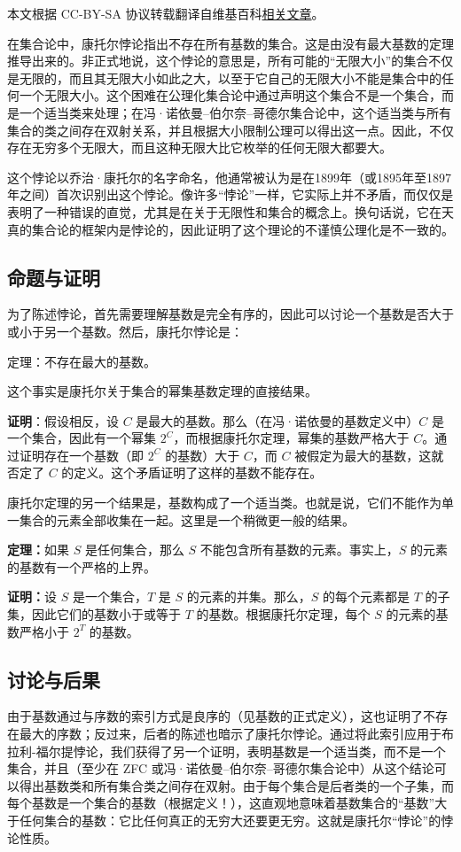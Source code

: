 
本文根据 CC-BY-SA 协议转载翻译自维基百科\href{https://en.wikipedia.org/wiki/Cantor\%27s_paradox}{相关文章}。

在集合论中，康托尔悖论指出不存在所有基数的集合。这是由没有最大基数的定理推导出来的。非正式地说，这个悖论的意思是，所有可能的“无限大小”的集合不仅是无限的，而且其无限大小如此之大，以至于它自己的无限大小不能是集合中的任何一个无限大小。这个困难在公理化集合论中通过声明这个集合不是一个集合，而是一个适当类来处理；在冯·诺依曼–伯尔奈–哥德尔集合论中，这个适当类与所有集合的类之间存在双射关系，并且根据大小限制公理可以得出这一点。因此，不仅存在无穷多个无限大，而且这种无限大比它枚举的任何无限大都要大。

这个悖论以乔治·康托尔的名字命名，他通常被认为是在1899年（或1895年至1897年之间）首次识别出这个悖论。像许多“悖论”一样，它实际上并不矛盾，而仅仅是表明了一种错误的直觉，尤其是在关于无限性和集合的概念上。换句话说，它在天真的集合论的框架内是悖论的，因此证明了这个理论的不谨慎公理化是不一致的。
\subsection{命题与证明}
为了陈述悖论，首先需要理解基数是完全有序的，因此可以讨论一个基数是否大于或小于另一个基数。然后，康托尔悖论是：

定理：不存在最大的基数。

这个事实是康托尔关于集合的幂集基数定理的直接结果。

\textbf{证明}：假设相反，设 $C$ 是最大的基数。那么（在冯·诺依曼的基数定义中）$C$ 是一个集合，因此有一个幂集 $2^C$，而根据康托尔定理，幂集的基数严格大于 $C$。通过证明存在一个基数（即 $2^C$ 的基数）大于 $C$，而 $C$ 被假定为最大的基数，这就否定了 $C$ 的定义。这个矛盾证明了这样的基数不能存在。

康托尔定理的另一个结果是，基数构成了一个适当类。也就是说，它们不能作为单一集合的元素全部收集在一起。这里是一个稍微更一般的结果。

\textbf{定理：}如果 $S$ 是任何集合，那么 $S$ 不能包含所有基数的元素。事实上，$S$ 的元素的基数有一个严格的上界。

\textbf{证明：}设 $S$ 是一个集合，$T$ 是 $S$ 的元素的并集。那么，$S$ 的每个元素都是 $T$ 的子集，因此它们的基数小于或等于 $T$ 的基数。根据康托尔定理，每个 $S$ 的元素的基数严格小于 $2^T$ 的基数。
\subsection{讨论与后果}
由于基数通过与序数的索引方式是良序的（见基数的正式定义），这也证明了不存在最大的序数；反过来，后者的陈述也暗示了康托尔悖论。通过将此索引应用于布拉利-福尔提悖论，我们获得了另一个证明，表明基数是一个适当类，而不是一个集合，并且（至少在 ZFC 或冯·诺依曼–伯尔奈–哥德尔集合论中）从这个结论可以得出基数类和所有集合类之间存在双射。由于每个集合是后者类的一个子集，而每个基数是一个集合的基数（根据定义！），这直观地意味着基数集合的“基数”大于任何集合的基数：它比任何真正的无穷大还要更无穷。这就是康托尔“悖论”的悖论性质。
